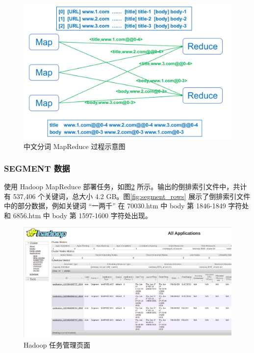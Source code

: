 \documentclass{ctexart}
\begin{document}
    \begin{figure}[t]
        \centering
        \includegraphics[width=\textwidth]{src/segment}
        \caption{中文分词 MapReduce 过程示意图}
        \label{fig:segment}
    \end{figure}

    \subsubsection{SEGMENT 数据}\label{subsubsec:segment_data}

    使用 Hadoop MapReduce 部署任务，如图\ref{fig:segment_tasks} 所示。输出的倒排索引文件中，共计有 537,406 个关键词，总大小 4.2 GB。图\ref{fig:segment_rows} 展示了倒排索引文件中的部分数据，例如关键词 “一两千” 在 70030.htm 中 body 第 1846-1849 字符处和 6856.htm 中 body 第 1597-1600 字符处出现。

    \begin{figure}[t]
        \centering
        \includegraphics[width=\textwidth]{src/segment_tasks}
        \caption{Hadoop 任务管理页面}
        \label{fig:segment_tasks}
    \end{figure}
\end{document}
